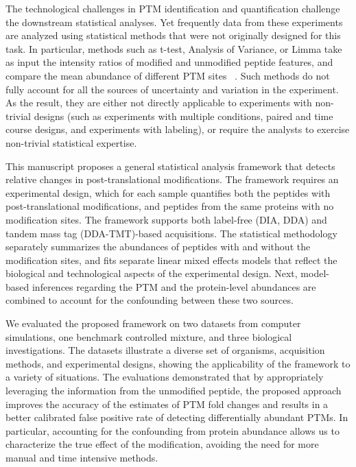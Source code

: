 \documentclass[mcp]{article}
\numberwithin{table}{section}
\begin{document}
The technological challenges in PTM identification and quantification challenge the downstream statistical analyses. Yet frequently data from these experiments are analyzed using statistical methods that were not originally designed for this task. In particular, methods such as t-test, Analysis of Variance, or Limma take as input the intensity ratios of modified and unmodified peptide features, and compare the mean abundance of different PTM sites~ \cite{Ritchie_15a}. Such methods do not fully account for all the sources of uncertainty and variation in the experiment. As the result, they are either not directly applicable to experiments with non-trivial designs (such as experiments with multiple conditions, paired and time course designs, and experiments with labeling), or require the analysts to exercise non-trivial statistical expertise.

This manuscript proposes a general statistical analysis framework that detects relative changes in post-translational modifications. The framework requires an experimental design, which for each sample quantifies both the peptides with post-translational modifications, and peptides from the same proteins with no modification sites. The framework supports both label-free (DIA, DDA) and tandem mass tag (DDA-TMT)-based acquisitions. The statistical methodology separately summarizes the abundances of peptides with and without the modification sites, and fits separate linear mixed effects models that reflect the biological and technological aspects of the experimental design. Next, model-based inferences regarding the PTM and the protein-level abundances are combined to account for the confounding between these two sources.

We evaluated the proposed framework on two datasets from computer simulations, one benchmark controlled mixture, and three biological investigations. The datasets illustrate a diverse set of organisms, acquisition methods, and experimental designs, showing the applicability of the framework to a variety of situations. The evaluations demonstrated that by appropriately leveraging the information from the unmodified peptide, the proposed approach improves the accuracy of the estimates of PTM fold changes and results in a better calibrated false positive rate of detecting differentially abundant PTMs. In particular, accounting for the confounding from protein abundance allows us to characterize the true effect of the modification, avoiding the need for more manual and time intensive methods.
\end{document}
